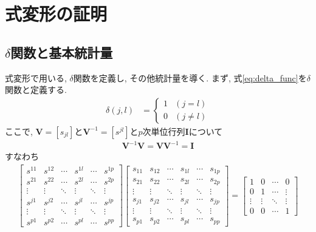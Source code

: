 \section{式変形の証明}
\subsection{$\delta$関数と基本統計量}
式変形で用いる, $\delta$関数を定義し, その他統計量を導く. 
まず, 式\eqref{eq:delta_func}を$\delta$関数と定義する. 
\begin{align}
  \label{eq:delta_func}
  \delta (j, l)
  &= \left\{
  \begin{array}{ll}
    1 &(j=l) \\
    0 &(j\neq l)
  \end{array}
  \right.
\end{align}
ここで, $\bm{V}=[s_{jl}]$と$\bm{V}^{-1}=[s^{jl}]$と$p$次単位行列$\bm{I}$について
\begin{align*}
  \bm{V}^{-1}\bm{V} = \bm{VV}^{-1} = \bm{I}
\end{align*}
すなわち
\begin{align*}
  \left[
    \begin{array}{cccccc}
      s^{11} &s^{12} & \cdots &s^{1l} &\cdots &s^{1p} \\
      s^{21} &s^{22} & \cdots &s^{2l} &\cdots &s^{2p} \\
      \vdots &\vdots & \ddots &\vdots &\ddots &\vdots \\
      s^{j1} &s^{j2} & \cdots &s^{jl} &\cdots &s^{jp} \\
      \vdots &\vdots & \ddots &\vdots &\ddots &\vdots \\
      s^{p1} &s^{p2} & \cdots &s^{pl} &\cdots &s^{pp} 
    \end{array}
  \right]
  \left[
    \begin{array}{cccccc}
      s_{11} &s_{12} & \cdots &s_{1l} &\cdots &s_{1p} \\
      s_{21} &s_{22} & \cdots &s_{2l} &\cdots &s_{2p} \\
      \vdots &\vdots & \ddots &\vdots &\ddots &\vdots \\
      s_{j1} &s_{j2} & \cdots &s_{jl} &\cdots &s_{jp} \\
      \vdots &\vdots & \ddots &\vdots &\ddots &\vdots \\
      s_{p1} &s_{p2} & \cdots &s_{pl} &\cdots &s_{pp} 
    \end{array}
  \right]
  =
  \left[
    \begin{array}{cccc}
      1 &0 &\cdots &0 \\
      0 &1 &\cdots &\vdots \\
      \vdots &\vdots &\ddots &\vdots \\
      0 &0 &\cdots &1
    \end{array}
  \right]
\end{align*}
